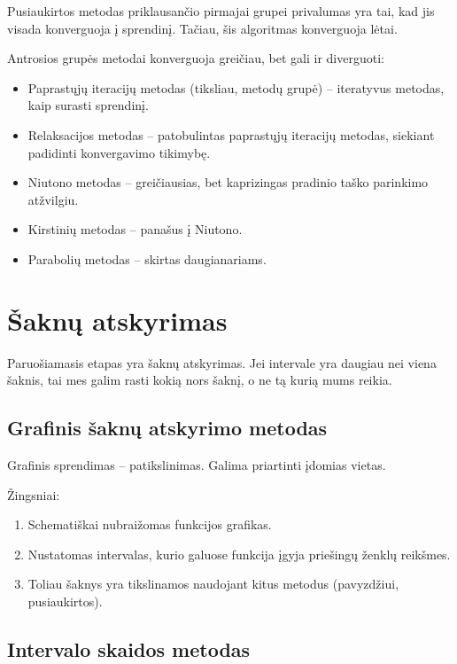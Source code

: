 Pusiaukirtos metodas priklausančio pirmajai grupei privalumas yra tai,
kad jis visada konverguoja į sprendinį. Tačiau, šis algoritmas konverguoja
lėtai.

Antrosios grupės metodai konverguoja greičiau, bet gali ir diverguoti:
\begin{itemize}
  \item Paprastųjų iteracijų metodas (tiksliau, metodų grupė) – iteratyvus
    metodas, kaip surasti sprendinį.
  \item Relaksacijos metodas – patobulintas paprastųjų iteracijų metodas,
    siekiant padidinti konvergavimo tikimybę.
  \item Niutono metodas – greičiausias, bet kaprizingas pradinio
    taško parinkimo atžvilgiu.
  \item Kirstinių metodas – panašus į Niutono.
  \item Parabolių metodas – skirtas daugianariams.
\end{itemize}

\section{Šaknų atskyrimas}

\cite[23-25]{textbook}

Paruošiamasis etapas yra šaknų atskyrimas. Jei intervale yra daugiau
nei viena šaknis, tai mes galim rasti kokią nors šaknį, o ne tą
kurią mums reikia.

\subsection{Grafinis šaknų atskyrimo metodas}

Grafinis sprendimas – patikslinimas. Galima priartinti įdomias vietas.

Žingsniai:
\begin{enumerate}
  \item Schematiškai nubraižomas funkcijos grafikas.
  \item Nustatomas intervalas, kurio galuose funkcija įgyja priešingų
    ženklų reikšmes.
  \item Toliau šaknys yra tikslinamos naudojant kitus metodus
    (pavyzdžiui, pusiaukirtos).
\end{enumerate}

\subsection{Intervalo skaidos metodas}

